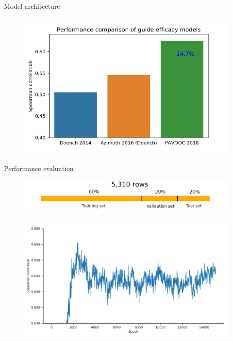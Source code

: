 \documentclass[Nike]{tuberlinbeamer}
\begin{document}
\begin{frame}{Model architecture}
  \begin{figure}
    \includegraphics[width=0.65\linewidth]{model_comparison2.png}
  \end{figure}
\end{frame}



\begin{frame}{Performance evaluation}
  \begin{figure}
    \includegraphics[width=0.60\linewidth]{./datasetpartition.png}
  \end{figure}
  \pause
  \begin{figure}
    \includegraphics[width=0.75\linewidth]{./validation_training_curve.png}
  \end{figure}

\end{frame}

\end{document}
